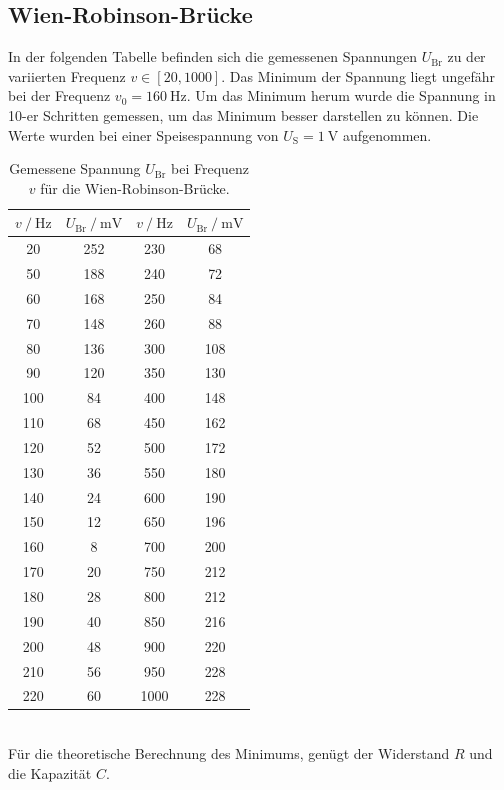 \subsection{Wien-Robinson-Brücke}
In der folgenden Tabelle befinden sich die gemessenen Spannungen $U_\text{Br}$ zu der variierten Frequenz $v \in \left [20, 1000\right ]$.
Das Minimum der Spannung liegt ungefähr bei der Frequenz $v_0 = \SI{160}{\hertz}$. Um das Minimum herum wurde die Spannung in 10-er
 Schritten gemessen, um das Minimum besser darstellen zu können. Die Werte wurden bei einer Speisespannung von $U_\text{S}=\SI{1}{\volt}$ aufgenommen.
\begin{table}
  \centering
  \label{tab:e}
  \begin{tabular}{cc|cc}
    \toprule
    {$v\:/\: \si{\hertz}$} & {$U_\text{Br} \:/\: \si{\milli\volt}$} & {$v\:/\: \si{\hertz}$} & {$U_\text{Br} \:/\: \si{\milli\volt}$} \\
    \midrule
    20 & 252 & 230 & 68 \\
    50 & 188 & 240 & 72 \\
    60 & 168 & 250 & 84 \\
    70 & 148 & 260 & 88 \\
    80 & 136 & 300 & 108 \\
    90 & 120 & 350 & 130 \\
    100 & 84 & 400 & 148 \\
    110 & 68 & 450 & 162 \\
    120 & 52 & 500 & 172 \\
    130 & 36 & 550 & 180 \\
    140 & 24 & 600 & 190 \\
    150 & 12 & 650 & 196 \\
    160 & 8  & 700 & 200 \\
    170 & 20 & 750 & 212 \\
    180 & 28 & 800 & 212 \\
    190 & 40 & 850 & 216 \\
    200 & 48 & 900 & 220 \\
    210 & 56 & 950 & 228 \\
    220 & 60 & 1000 & 228 \\
    \bottomrule
  \end{tabular}
  \caption{Gemessene Spannung $U_\text{Br}$ bei Frequenz $v$ für die Wien-Robinson-Brücke.}
\end{table}
\\
Für die theoretische Berechnung des Minimums, genügt der Widerstand $R$ und die Kapazität $C$.
